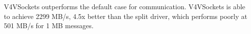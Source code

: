 \documentclass[a0paper,portrait,final]{baposter}
\begin{document}
\begin{poster}
{\begin{multicols}{2}
\hspace{0.5em}
V4VSockets outperforms the default case for communication. V4VSockets is able
to achieve 2299 MB/s, 4.5x better than the split driver, which performs poorly
at 501 MB/s for 1 MB messages.
%
\end{multicols}

}

\end{poster}
\end{document}
